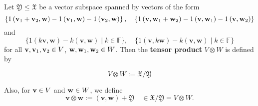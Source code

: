 \begin{definition} Let \(\mathfrak{Y} \leq  \mathfrak{X}\) be a vector subspace spanned by vectors of the form
\[
\left\{  {1\left( {{\bf v}_1+{\bf v}_2,\mathbf{w}}\right)  - 1\left( {{\bf v}_1,\mathbf{w}}\right)  - 1\left( {{\bf v}_2,\mathbf{w}}\right) }\right\}  ,\quad \left\{  {1\left( {\mathbf{v},{\bf w}_1 + {\bf w}_2}\right)  - 1\left( {\mathbf{v},{\bf w}_1}\right)  - 1\left( {\mathbf{v},{\bf w}_2}\right) }\right\}
\]
and
\[
\{ 1\left( {k\mathbf{v},\mathbf{w}}\right)  - k\left( {\mathbf{v},\mathbf{w}}\right)  \mid  k \in  \mathbb{F}\},
\quad
\{ 1\left( {\mathbf{v},k\mathbf{w}}\right)  - k\left( {\mathbf{v},\mathbf{w}}\right)  \mid  k \in  \mathbb{F}\}
\]
for all ${\bf v}, {\bf v}_1, {\bf v}_2 \in V$, ${\bf w}, {\bf w}_1, {\bf w}_2 \in W$. Then the {\bf tensor product} \(V \otimes  W\) is defined by

\[
V \otimes  W := \mathfrak{X}/\mathfrak{Y}
\]

\noindent Also, for ${\bf v} \in V$ and ${\bf w} \in W$, we define 
\[\mathbf{v} \otimes  \mathbf{w} := \left( {\mathbf{v},\mathbf{w}}\right)  + \mathfrak{Y} \quad \in  \mathfrak{X}/\mathfrak{Y} = V \otimes W.\]
\end{definition}


